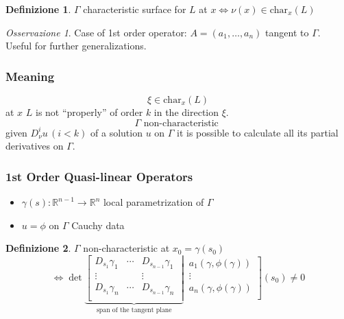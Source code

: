 \documentclass[serif,notheorems]{beamer}
\theoremstyle{definition} %
\newtheorem{definition}{Definizione}[section] %
\theoremstyle{remark}
\newtheorem*{remark}{Osservazione}
\begin{document}
\begin{frame}
\begin{definition}
$\Gamma$ characteristic surface for $L$ at $x \iff \nu(x) \in\text{char}_x (L)$
\end{definition}
\begin{remark}
Case of 1st order operator: $A=(a_1,\ldots ,a_n)$ tangent to $\Gamma$.\\
Useful for further generalizations.
\end{remark}
\end{frame}

\begin{frame}
\frametitle{Meaning}
$$\xi \in \text{char}_x (L)$$
at $x$ $L$ is not ``properly'' of order $k$ in the direction $\xi$.
\vspace{5mm}
$$\Gamma \text{ non-characteristic }$$ 
given $D^i_\nu u \,(i<k)$ of a solution $u$ on $\Gamma$
it is possible to calculate all its partial derivatives on $\Gamma$.
\end{frame}

\begin{frame}
\frametitle{1st Order Quasi-linear Operators}
\begin{itemize}
\item $\gamma (s): \mathbb{R}^{n-1}\rightarrow \mathbb{R}^n$ local parametrization of $\Gamma$
\item $u = \phi$ on $\Gamma$ Cauchy data
\end{itemize}
\begin{definition}
$\Gamma$ non-characteristic at $x_0=\gamma (s_0)$\\
\begin{equation*}
\iff \det
\underbrace{
\left[
\begin{matrix}
D_{s_1}\gamma_1 & \cdots & D_{s_{n-1}}\gamma_1 \\
\vdots &  & \vdots \\
D_{s_1}\gamma_n & \cdots & D_{s_{n-1}}\gamma_n \\
\end{matrix}\;\right|}_{\text{span of the tangent plane}} \,
\left.
\begin{matrix}
a_1(\gamma, \phi(\gamma))\\
\vdots\\
a_n(\gamma, \phi(\gamma))\\
\end{matrix}\right] (s_0) \neq 0
\end{equation*}
\end{definition}
\end{frame}
\end{document}
